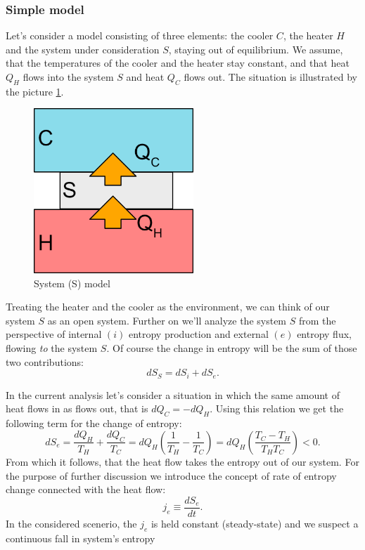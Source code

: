 \documentclass[a4paper,12pt]{article}
\begin{document}
\subsubsection{Simple model}
Let's consider a model consisting of three elements: the cooler $C$, the heater $H$ and the system under consideration $S$, staying out of equilibrium.
We assume, that the temperatures of the cooler and the heater stay constant, and that heat $Q_H$ flows into the system $S$ and heat $Q_C$ flows out. The situation is illustrated by the picture \ref{Fig2}.
\begin{figure}[ht!]
\centering \includegraphics[width=6cm]{system} \caption{System (S) model}
\label{Fig2} 
\end{figure}

Treating the heater and the cooler as the environment, we can think of our system $S$ as an open system.
Further on we'll analyze the system $S$ from the perspective of internal $(i)$ entropy production
and external $(e)$ entropy flux, flowing \emph{to} the system $S$. 
Of course the change in entropy will be the sum of those two contributions:
\begin{equation}
dS_S=dS_i+dS_e.
\label{entrosum}
\end{equation}

In the current analysis let's consider a situation in which the same amount of heat flows in as flows out, that is $dQ_C=-dQ_H$. Using this relation we get the following term for the change of entropy:
\begin{equation}
dS_e=\frac{dQ_H}{T_H}+\frac{dQ_C}{T_C}=dQ_H\left(\frac{1}{T_H}-\frac{1}{T_C}\right)
=dQ_H\left(\frac{T_C-T_H}{T_HT_C}\right)<0.
\label{dSe1}
\end{equation}
From which it follows, that the heat flow takes the entropy out of our system.
For the purpose of further discussion we introduce the concept of rate of entropy change connected with the heat flow:
\begin{equation}
j_e \equiv  \frac{dS_e}{dt}. 
\end{equation}
In the considered scenerio, the $j_e$ is held constant (steady-state) and we suspect a continuous fall in system's entropy
\end{document}
